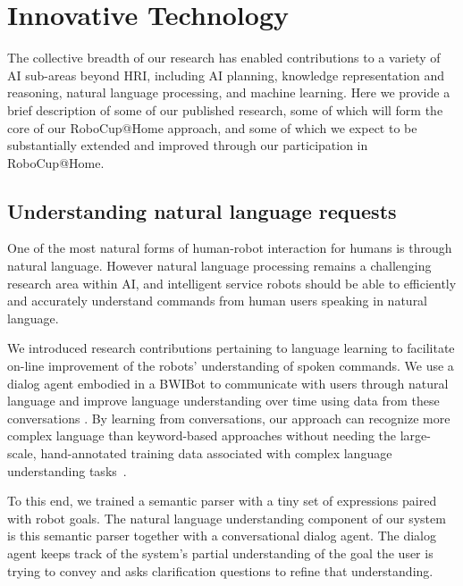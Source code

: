 \section{Innovative Technology}
\label{sec:tech}

The collective breadth of our research has enabled contributions to a
variety of AI sub-areas beyond HRI, including AI planning, knowledge
representation and reasoning, natural language processing, and machine
learning.  Here we provide a brief description of some of our
published research, some of which will form the core of our
RoboCup@Home approach, and some of which we expect to be substantially
extended and improved through our participation in RoboCup@Home.


\subsection{Understanding natural language requests}
One of the most natural forms of human-robot interaction for humans is through natural language.
However natural language processing remains a challenging research area within AI, and intelligent service robots should be able to efficiently and accurately understand commands from human users speaking in natural language.

We introduced research contributions pertaining to language learning
to facilitate on-line improvement of the robots' understanding of
spoken commands.  We use a dialog agent embodied in a BWIBot to
communicate with users through natural language and improve language
understanding over time using data from these conversations
\cite{thomason:15}.  By learning from conversations, our approach can
recognize more complex language than keyword-based approaches without
needing the large-scale, hand-annotated training data associated with
complex language understanding tasks~\cite{thomason:15}. 

To this end, we trained a semantic parser with a tiny set of
expressions paired with robot goals.  The natural language
understanding component of our system is this semantic parser together
with a conversational dialog agent.  The dialog agent keeps track of
the system's partial understanding of the goal the user is trying to
convey and asks clarification questions to refine that understanding.

